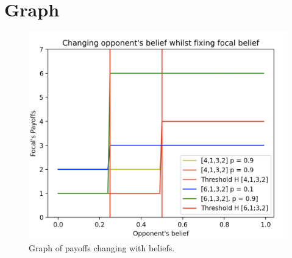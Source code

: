 \documentclass[]{llncs}
\begin{document}
\section{Graph} 
\begin{figure}
\centering
\includegraphics[width=15cm]{images/beliefs}
\caption{\label{beliefs} Graph of payoffs changing with beliefs.}
\end{figure}
\end{document}
